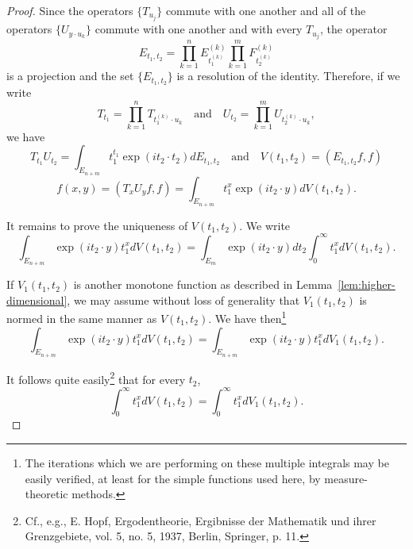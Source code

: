 \documentclass{article}
\begin{document}
\begin{proof}
Since the operators $\{T_{u_j}\}$ commute with one another and all of the operators $\{U_{y \cdot u_k}\}$ commute with one another and with every $T_{u_j}$, the operator
\begin{equation}
E_{t_1, t_2} = \prod_{k=1}^{n} E_{t_1^{(k)}}^{(k)} \prod_{k=1}^{m} F_{t_2^{(k)}}^{(k)}
\label{eq:joint-spectral-family}
\end{equation}
is a projection and the set $\{E_{t_1, t_2}\}$ is a resolution of the identity. Therefore, if we write
\begin{equation}
T_{t_1} = \prod_{k=1}^{n} T_{t_1^{(k)} \cdot u_k} \quad \text{and} \quad U_{t_2} = \prod_{k=1}^{m} U_{t_2^{(k)} \cdot u_k},
\label{eq:product-operators}
\end{equation}
we have
\begin{equation}
T_{t_1} U_{t_2} = \int_{E_{n+m}} t_1^{t_1} \exp(i t_2 \cdot t_2) dE_{t_1, t_2} \quad \text{and} \quad V(t_1, t_2) = (E_{t_1, t_2} f, f)
\label{eq:spectral-formula}
\end{equation}
\begin{equation}
f(x, y) = (T_x U_y f, f) = \int_{E_{n+m}} t_1^x \exp(i t_2 \cdot y) dV(t_1, t_2).
\label{eq:final-representation}
\end{equation}

It remains to prove the uniqueness of $V(t_1, t_2)$. We write
\begin{equation}
\int_{E_{n+m}} \exp(i t_2 \cdot y) t_1^x dV(t_1, t_2) = \int_{E_m} \exp(i t_2 \cdot y) dt_2 \int_0^{\infty} t_1^x dV(t_1, t_2).
\label{eq:uniqueness-step1}
\end{equation}

If $V_1(t_1, t_2)$ is another monotone function as described in Lemma~\ref{lem:higher-dimensional}, we may assume without loss of generality that $V_1(t_1, t_2)$ is normed in the same manner as $V(t_1, t_2)$. We have then\footnote{The iterations which we are performing on these multiple integrals may be easily verified, at least for the simple functions used here, by measure-theoretic methods.}
\begin{equation}
\int_{E_{n+m}} \exp(i t_2 \cdot y) t_1^x dV(t_1, t_2) = \int_{E_{n+m}} \exp(i t_2 \cdot y) t_1^x dV_1(t_1, t_2).
\label{eq:uniqueness-step2}
\end{equation}

It follows quite easily\footnote{Cf., e.g., E. Hopf, Ergodentheorie, Ergibnisse der Mathematik und ihrer Grenzgebiete, vol. 5, no. 5, 1937, Berlin, Springer, p. 11.} that for every $t_2$,
\begin{equation}
\int_0^{\infty} t_1^x dV(t_1, t_2) = \int_0^{\infty} t_1^x dV_1(t_1, t_2).
\label{eq:uniqueness-step3}
\end{equation}


\end{proof}
\end{document}
